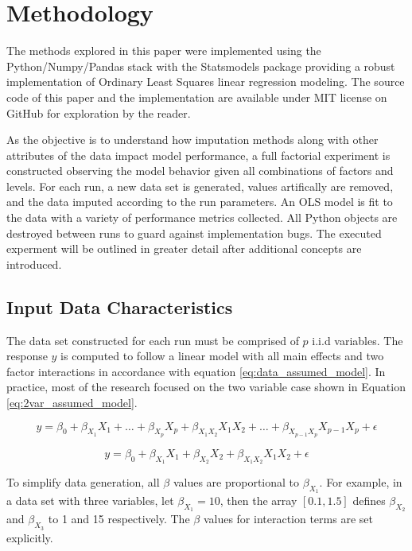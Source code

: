 \documentclass[../../paper.tex]{subfiles}
\begin{document}
\section{Methodology}
The methods explored in this paper were implemented using
the Python/Numpy/Pandas stack with the Statsmodels package providing a robust
implementation of Ordinary Least Squares linear regression modeling.
The source code of this paper and the implementation are available under MIT license on GitHub for exploration by the reader.

As the objective is to understand how imputation methods along with other attributes of the data impact model performance, a full factorial experiment is constructed observing the model behavior given all combinations of factors and levels.
For each run, a new data set is generated, values artifically are removed, and the data imputed according to the run parameters. An OLS model is fit to the data  with a variety of performance metrics collected. All Python objects are destroyed between runs to guard against implementation bugs. The executed experment will be outlined in greater detail after additional concepts are introduced.


\subsection{Input Data Characteristics}
The data set constructed for each run must be comprised of $p$ i.i.d variables. The response $y$ is computed
to follow a linear model with all main effects and two factor interactions
in accordance with equation \ref{eq:data_assumed_model}. In practice, most of
the research focused on the two variable case shown in Equation
\ref{eq:2var_assumed_model}.

\begin{equation}\label{eq:data_assumed_model}
  y = \beta_{0} + \beta_{ X_{1} } X_{1}  + \ldots + \beta_{X_{p}}X_{p} +
  \beta_{X_{1}X_{2}}X_{1}X_{2} + \ldots +\beta_{X_{p-1}X_{p}}X_{p-1}X_{p} + \epsilon
\end{equation}


\begin{equation}\label{eq:2var_assumed_model}
  y = \beta_{0} + \beta_{ X_{1}} X_{1} + \beta_{X_{2} }X_{2} +
  \beta_{ X_{1} X_{2} } X_{1}X_{2} + \epsilon
\end{equation}

To simplify data generation, all $\beta$ values are proportional to $\beta_{X_{1}}$.
For example, in a data set with three variables, let $\beta_{X_{1}} = 10$, then
the array $[0.1, 1.5]$ defines $\beta_{X_{2}}$ and $\beta_{X_{3}}$ to 1 and 15 respectively.
The $\beta$ values for interaction terms are set explicitly.
\end{document}
